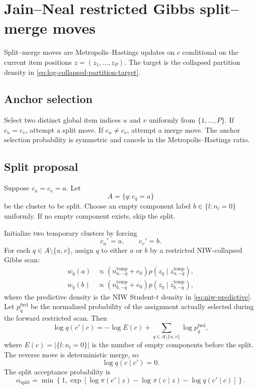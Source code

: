\documentclass[11pt]{article}
\begin{document}
\section{Jain--Neal restricted Gibbs split--merge moves}

Split--merge moves are Metropolis--Hastings updates on $c$ conditional on the
current item positions $z=(z_1,\dots,z_P)$.  The target is the collapsed
partition density in \eqref{eq:log-collapsed-partition-target}.

\subsection{Anchor selection}

Select two distinct global item indices $u$ and $v$ uniformly from
$\{1,\dots,P\}$.  If $c_u=c_v$, attempt a split move.  If $c_u\neq c_v$,
attempt a merge move.  The anchor selection probability is symmetric and
cancels in the Metropolis--Hastings ratio.

\subsection{Split proposal}

Suppose $c_u=c_v=a$.  Let
\[
    A=\{q:c_q=a\}
\]
be the cluster to be split.  Choose an empty component label
$b\in\{l:n_l=0\}$ uniformly.  If no empty component exists, skip the split.

Initialize two temporary clusters by forcing
\[
    c_u'=a,
    \qquad
    c_v'=b.
\]
For each $q\in A\setminus\{u,v\}$, assign $q$ to either $a$ or $b$ by a
restricted NIW-collapsed Gibbs scan:
\begin{align}
    w_q(a)&\propto
    (n_{a,-q}^{\mathrm{temp}}+e_0)
    p(z_q\mid z_{a,-q}^{\mathrm{temp}}),\\
    w_q(b)&\propto
    (n_{b,-q}^{\mathrm{temp}}+e_0)
    p(z_q\mid z_{b,-q}^{\mathrm{temp}}),
\end{align}
where the predictive density is the NIW Student-$t$ density in
\eqref{eq:niw-predictive}.  Let $p_q^{\mathrm{fwd}}$ be the normalized
probability of the assignment actually selected during the forward restricted
scan.  Then
\begin{equation}
    \log q(c'\mid c)
    =
    -\log E(c)
    +
    \sum_{q\in A\setminus\{u,v\}}\log p_q^{\mathrm{fwd}},
    \label{eq:split-forward-probability}
\end{equation}
where $E(c)=|\{l:n_l=0\}|$ is the number of empty components before the split.
The reverse move is deterministic merge, so
\[
    \log q(c\mid c')=0.
\]
The split acceptance probability is
\begin{equation}
    \alpha_{\mathrm{split}}
    =
    \min\left\{1,
    \exp\left[
    \log\pi(c'\mid z)-\log\pi(c\mid z)
    -\log q(c'\mid c)
    \right]
    \right\}.
    \label{eq:split-acceptance}
\end{equation}
\end{document}

